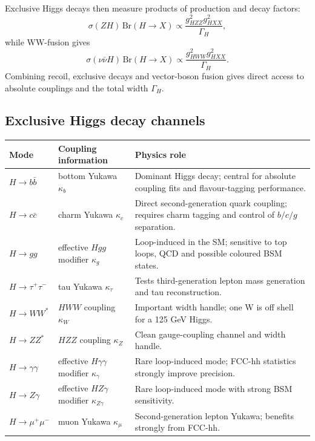 \documentclass[11pt,a4paper]{report}
\newcommand{\br}{\mathrm{Br}}
\begin{document}
Exclusive Higgs decays then measure products of production and decay factors:
\begin{equation}
  \sigma(ZH)\,\br(H\to X)
  \propto \frac{g_{HZZ}^2g_{HXX}^2}{\Gamma_H},
\end{equation}
while WW-fusion gives
\begin{equation}
  \sigma(\nu\bar\nu H)\,\br(H\to X)
  \propto \frac{g_{HWW}^2g_{HXX}^2}{\Gamma_H}.
\end{equation}
Combining recoil, exclusive decays and vector-boson fusion gives direct access to absolute couplings and the total width $\Gamma_H$.

\subsection{Exclusive Higgs decay channels}
\begin{longtable}{p{}p{}p{}}
\toprule
Mode & Coupling information & Physics role \\
\midrule
$H\to b\bar b$ & bottom Yukawa $\kappa_b$ & Dominant Higgs decay; central for absolute coupling fits and flavour-tagging performance. \\
$H\to c\bar c$ & charm Yukawa $\kappa_c$ & Direct second-generation quark coupling; requires charm tagging and control of $b/c/g$ separation. \\
$H\to gg$ & effective $Hgg$ modifier $\kappa_g$ & Loop-induced in the SM; sensitive to top loops, QCD and possible coloured BSM states. \\
$H\to \tau^+\tau^-$ & tau Yukawa $\kappa_\tau$ & Tests third-generation lepton mass generation and tau reconstruction. \\
$H\to WW^*$ & $HWW$ coupling $\kappa_W$ & Important width handle; one W is off shell for a 125 GeV Higgs. \\
$H\to ZZ^*$ & $HZZ$ coupling $\kappa_Z$ & Clean gauge-coupling channel and width handle. \\
$H\to\gamma\gamma$ & effective $H\gamma\gamma$ modifier $\kappa_\gamma$ & Rare loop-induced mode; FCC-hh statistics strongly improve precision. \\
$H\to Z\gamma$ & effective $HZ\gamma$ modifier $\kappa_{Z\gamma}$ & Rare loop-induced mode with strong BSM sensitivity. \\
$H\to\mu^+\mu^-$ & muon Yukawa $\kappa_\mu$ & Second-generation lepton Yukawa; benefits strongly from FCC-hh. \\
\bottomrule
\end{longtable}
\end{document}

